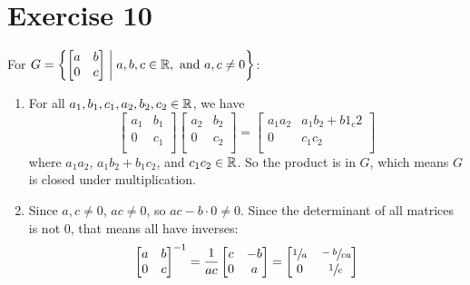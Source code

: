 \documentclass[12pt]{article}
\begin{document}
    \section*{Exercise 10}
    For $G = \left\{ \begin{bmatrix} a & b \\ 0 & c \end{bmatrix} \;
    \middle\vert \; a, b, c \in \mathbb{R}, \text{ and } a, c \neq 0 \right\}$:
    \begin{enumerate}[label=\textbf{\alph*.}]
        \item 
            For all $a_1, b_1, c_1, a_2, b_2, c_2 \in \mathbb{R}$, we have
            \[ \begin{bmatrix}
            a_1 & b_1 \\
            0 & c_1 \\
            \end{bmatrix}
            \begin{bmatrix}
            a_2 & b_2 \\
            0 & c_2 \\
            \end{bmatrix}
            = \begin{bmatrix}
            a_1a_2 & a_1b_2 + b1_c2 \\
            0 & c_1c_2 \\
            \end{bmatrix} \]
            where $a_1a_2$, $a_1b_2 + b_1c_2$, and $c_1c_2 \in \mathbb{R}$.
            So the product is in $G$,
            which means $G$ is closed under multiplication.
        \item
            Since $a, c \neq 0$, $ac \neq 0$,
            so $ac - b \cdot 0 \neq 0$.
            Since the determinant of all matrices is not 0, that means all
            have inverses:
            \[ \begin{bmatrix}
            a & b \\
            0 & c \\
            \end{bmatrix}^{-1}
            = \dfrac{1}{ac}\begin{bmatrix}
            c & -b \\
            0 & a \\
            \end{bmatrix}
            = \begin{bmatrix}
            \sfrac{1}{a} & \sfrac{-b}{ca} \\
            0 & \sfrac{1}{c} \\

\end{bmatrix}\]
\end{enumerate}
\end{document}
